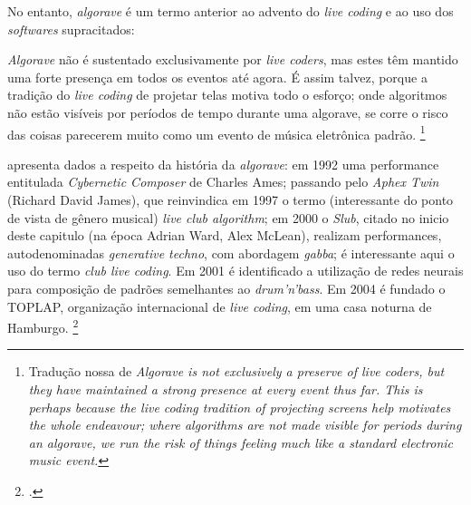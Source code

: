 No entanto, \emph{algorave} é um termo anterior ao advento do \emph{live coding} e ao uso dos \emph{softwares} supracitados:

\begin{citacao}
\emph{Algorave} não é sustentado exclusivamente por \emph{live coders}, mas estes têm mantido uma forte presença em todos os eventos até agora. É assim talvez, porque a tradição do \emph{live coding} de projetar telas motiva todo o esforço; onde algoritmos não estão visíveis por períodos de tempo durante uma algorave, se corre o risco das coisas parecerem muito como um evento de música eletrônica padrão. \cite[p.~356]{collins_algorave:_2014} \footnote{Tradução nossa de \emph{Algorave is not exclusively a preserve of live coders, but they have maintained a strong presence at every event thus far. This is perhaps because the live coding tradition of projecting screens help motivates the whole endeavour; where algorithms are not made visible for periods during an algorave, we run the risk of things feeling much like a standard electronic music event.}}
\end{citacao}


 apresenta dados a respeito da história da \emph{algorave}: em 1992 uma performance entitulada \emph{Cybernetic Composer} de Charles Ames; passando pelo \emph{Aphex Twin} (Richard David James), que  reinvindica em 1997 o termo (interessante do ponto de vista de gênero musical) \emph{live club algorithm}; em 2000 o \emph{Slub}, citado no inicio deste capitulo (na época Adrian Ward, Alex McLean), realizam performances, autodenominadas \emph{generative techno}, com abordagem \emph{gabba}; é interessante aqui o uso do termo \emph{club live coding}. Em 2001 é identificado a utilização de redes neurais para composição de padrões semelhantes ao \emph{drum'n'bass}. Em 2004 é fundado o TOPLAP, organização internacional  de \emph{live coding}, em uma casa noturna de Hamburgo. \footnote{.}

 

